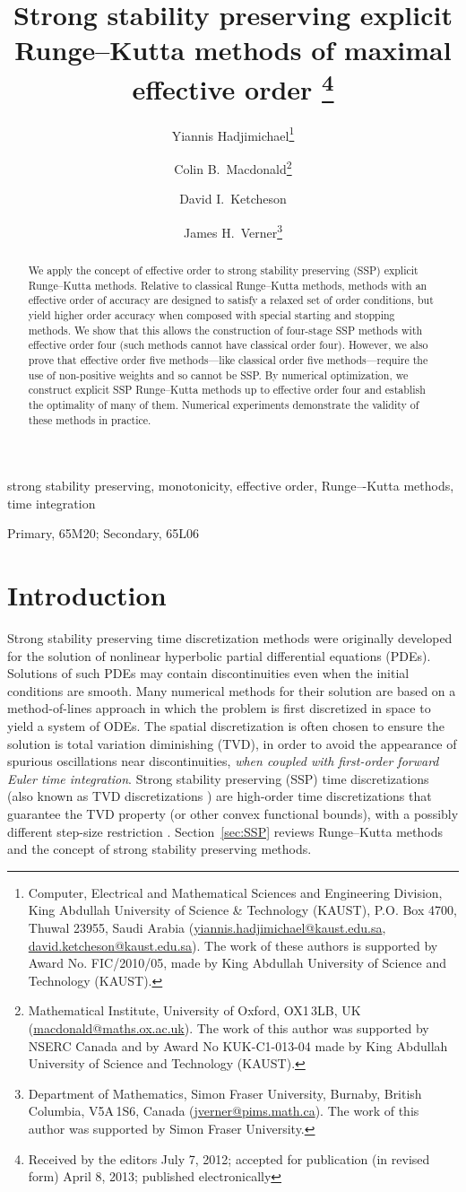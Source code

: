 \documentclass{siamltex}  %
\title{Strong stability preserving explicit Runge--Kutta methods of maximal effective order
		\thanks{Received by the editors July 7, 2012; 
		accepted for publication (in revised form) April 8, 2013; 
		published electronically }
}%
\author{
        Yiannis Hadjimichael\thanks{Computer, Electrical and Mathematical Sciences and 
        Engineering Division, King Abdullah University of Science \& Technology (KAUST), 
        P.O. Box 4700, Thuwal 23955, Saudi Arabia
        (\url{yiannis.hadjimichael@kaust.edu.sa}, 
        \url{david.ketcheson@kaust.edu.sa}).
        The work of these authors is supported by Award No. FIC/2010/05, made by King 
        Abdullah University of Science and Technology (KAUST).}
        \and 
        Colin B.~Macdonald\thanks{Mathematical Institute, University of Oxford, OX1\,3LB, UK 
        (\url{macdonald@maths.ox.ac.uk}).
        The work of this author was supported by NSERC 
        Canada and by Award No KUK-C1-013-04 made by King Abdullah University of Science 
        and Technology (KAUST).}
        \and 
        David I.~Ketcheson\footnotemark[1]
        \and 
        James H.~Verner\thanks{Department of Mathematics, Simon Fraser University,
        Burnaby, British Columbia, V5A\,1S6, Canada
        (\url{jverner@pims.math.ca}).
        The work of this author was supported by Simon Fraser University.}
}%
\date{}
\begin{document}
\maketitle
        
\begin{abstract}
We apply the concept of effective order to strong stability preserving (SSP) explicit 
Runge--Kutta methods.
Relative to classical Runge--Kutta methods, methods with an effective order of accuracy are 
designed to satisfy a relaxed set of order conditions, but yield higher order accuracy  when 
composed with special starting and stopping methods. 
We show that this allows the construction of four-stage SSP methods with effective order four 
(such methods cannot have classical order four). 
However, we also prove that effective order five methods---like classical order five 
methods---require the use of non-positive weights and so cannot be SSP.
By numerical optimization, we construct explicit SSP Runge--Kutta methods up to effective order 
four and establish the optimality of many of them.
Numerical experiments demonstrate the validity of these methods in practice.
\end{abstract}

\begin{keywords} 
	strong stability preserving, monotonicity, effective order, Runge–-Kutta methods, 
	time integration
\end{keywords}

\begin{AMS}
	Primary, 65M20; Secondary, 65L06
\end{AMS}

\pagestyle{myheadings}
\thispagestyle{plain}


\section{Introduction}\label{sec:Intro}
Strong stability preserving time discretization methods were originally
developed for the solution of nonlinear hyperbolic 
partial differential equations (PDEs).  Solutions of such PDEs may 
contain discontinuities even when the initial conditions are smooth.
Many numerical methods for their solution are based on a method-of-lines approach 
in which the problem is first discretized in space to yield a system of ODEs. 
The spatial discretization is often chosen to ensure the solution is total variation diminishing (TVD),
in order to avoid the appearance of spurious oscillations near discontinuities,
\emph{when coupled with first-order forward Euler time integration}.
Strong stability preserving (SSP) time discretizations (also known as TVD
discretizations \cite{Gottlieb/Shu:1998}) are high-order time
discretizations that guarantee the TVD property (or other convex functional bounds), with a
possibly different step-size restriction \cite{Gottlieb2011a}.
Section~\ref{sec:SSP} reviews Runge--Kutta methods and the concept of
strong stability preserving methods.
\end{document}
